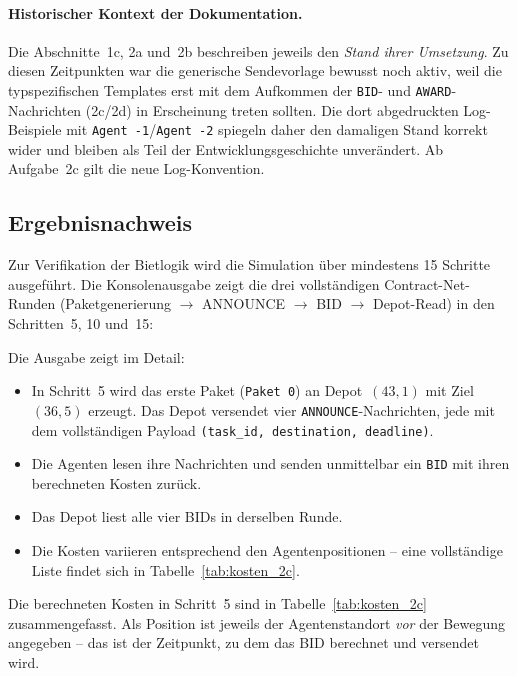 \paragraph{Historischer Kontext der Dokumentation.}
Die Abschnitte~1c, 2a und~2b beschreiben jeweils den \textit{Stand ihrer Umsetzung}. Zu diesen Zeitpunkten war die generische Sendevorlage bewusst noch aktiv, weil die typspezifischen Templates erst mit dem Aufkommen der \texttt{BID}- und \texttt{AWARD}-Nachrichten (2c/2d) in Erscheinung treten sollten. Die dort abgedruckten Log-Beispiele mit \texttt{Agent -1}/\texttt{Agent -2} spiegeln daher den damaligen Stand korrekt wider und bleiben als Teil der Entwicklungsgeschichte unverändert. Ab Aufgabe~2c gilt die neue Log-Konvention.


\subsection{Ergebnisnachweis}
\label{sssec:bietlogik_2c_nachweis}

Zur Verifikation der Bietlogik wird die Simulation über mindestens 15 Schritte ausgeführt. Die Konsolenausgabe zeigt die drei vollständigen Contract-Net-Runden (Paketgenerierung \(\to\) ANNOUNCE \(\to\) BID \(\to\) Depot-Read) in den Schritten~5, 10 und~15:



Die Ausgabe zeigt im Detail:
\begin{itemize}
    \item In Schritt~5 wird das erste Paket (\texttt{Paket 0}) an Depot~\((43, 1)\) mit Ziel~\((36, 5)\) erzeugt. Das Depot versendet vier \texttt{ANNOUNCE}-Nachrichten, jede mit dem vollständigen Payload \texttt{(task\_id, destination, deadline)}.
    \item Die Agenten lesen ihre Nachrichten und senden unmittelbar ein \texttt{BID} mit ihren berechneten Kosten zurück.
    \item Das Depot liest alle vier BIDs in derselben Runde.
    \item Die Kosten variieren entsprechend den Agentenpositionen -- eine vollständige Liste findet sich in Tabelle~\ref{tab:kosten_2c}.
\end{itemize}

Die berechneten Kosten in Schritt~5 sind in Tabelle~\ref{tab:kosten_2c} zusammengefasst. Als Position ist jeweils der Agentenstandort \textit{vor} der Bewegung angegeben -- das ist der Zeitpunkt, zu dem das BID berechnet und versendet wird.

